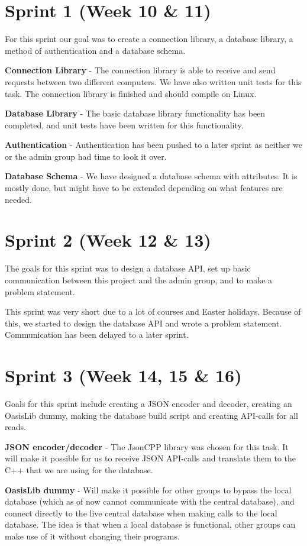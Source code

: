 \section{Sprint 1 (Week 10 \& 11)}
For this sprint our goal was to create a connection library, a database library, a method of authentication and a database schema.

\textbf{Connection Library} - The connection library is able to receive and send requests between two different computers. We have also written unit tests for this task. The connection library is finished and should compile on Linux.

\textbf{Database Library} - The basic database library functionality has been completed, and unit tests have been written for this functionality.

\textbf{Authentication} - Authentication has been pushed to a later sprint as neither we or the admin group had time to look it over.

\textbf{Database Schema} - We have designed a database schema with attributes. It is mostly done, but might have to be extended depending on what features are needed.


\section{Sprint 2 (Week 12 \& 13)}
The goals for this sprint was to design a database API, set up basic communication between this project and the admin group, and to make a problem statement.

This sprint was very short due to a lot of courses and Easter holidays. Because of this, we started to design the database API and wrote a problem statement. Communication has been delayed to a later sprint.

\section{Sprint 3 (Week 14, 15 \& 16)}
Goals for this sprint include creating a JSON encoder and decoder, creating an OasisLib dummy, making the database build script and creating API-calls for all reads.

\textbf{JSON encoder/decoder} - The JsonCPP library was chosen for this task. It will make it possible for us to receive JSON API-calls and translate them to the C++ that we are using for the database.

\textbf{OasisLib dummy} - Will make it possible for other groups to bypass the local database (which as of now cannot communicate with the central database), and connect directly to the live central database when making calls to the local database. The idea is that when a local database is functional, other groups can make use of it without changing their programs.

